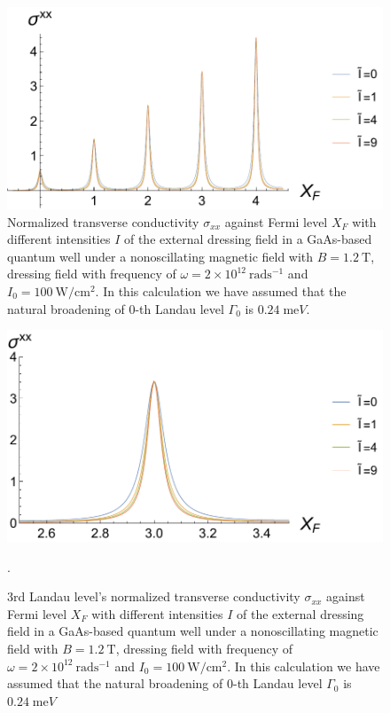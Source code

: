 \begin{figure}[t]
\includegraphics[scale=0.55]{figures/fig_5}
\caption{\label{fig_5} Normalized transverse conductivity $\sigma_{xx}$ against Fermi level $X_F$ with different intensities $I$ of the external dressing field in a GaAs-based quantum well under a nonoscillating magnetic field with $B = 1.2~\text{T}$, dressing field with frequency of $\omega =2\times10^{12}~\text{rad}\text{s}^{-1}$ and $I_0 =100~\text{W}/\text{cm}^{2}$. In this calculation we have assumed that the natural  broadening of $0$-th Landau level $\Gamma_0$ is $0.24\;\text{me}V$.}
\end{figure}
\begin{figure}[t]
\includegraphics[scale=0.55]{figures/fig_6}
\caption{\label{fig_6} $3$rd Landau level’s normalized transverse conductivity $\sigma_{xx}$ against Fermi level $X_F$ with different intensities $I$ of the external dressing field in a GaAs-based quantum well under a nonoscillating magnetic field with $B = 1.2~\text{T}$, dressing field with frequency of $\omega =2\times10^{12}~\text{rad}\text{s}^{-1}$ and $I_0 =100~\text{W}/\text{cm}^{2}$. In this calculation we have assumed that the natural  broadening of $0$-th Landau level $\Gamma_0$ is $0.24\;\text{me}V$}.
\end{figure}

